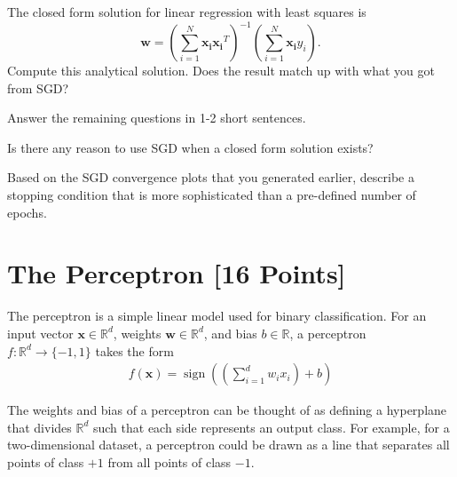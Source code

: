 \begin{problem}[2]
  The closed form solution for linear regression with least squares is \[\mathbf{w} = \left(\sum_{i=1}^N \mathbf{x_i}\mathbf{x_i}^T\right)^{-1}\left(\sum_{i=1}^N \mathbf{x_i}y_i\right).\]  Compute this analytical solution.  Does the result match up with what you got from SGD?
\end{problem}
\begin{solution}
 
\end{solution}

Answer the remaining questions in 1-2 short sentences.

\begin{problem}[2]
  Is there any reason to use SGD when a closed form solution exists?
\end{problem}
\begin{solution}
  
\end{solution}

\begin{problem}[2]
  Based on the SGD convergence plots that you generated earlier, describe a stopping condition that is more sophisticated than a pre-defined number of epochs.
\end{problem}
\begin{solution}
  
\end{solution}



\newpage
\section{The Perceptron [16 Points]}

The perceptron is a simple linear model used for binary classification. For an input vector $\mathbf{x} \in \mathbb{R}^d$, weights $\mathbf{w} \in \mathbb{R}^d$, and bias $b \in \mathbb{R}$, a perceptron $f: \mathbb{R}^d \rightarrow \{-1,1\}$ takes the form
\begin{align*}
  f(\mathbf{x}) = \operatorname{sign}\left(\left(\sum_{i=1}^d w_i x_i\right) + b \right)
\end{align*}

The weights and bias of a perceptron can be thought of as defining a hyperplane that divides $\mathbb{R}^d$ such that each side represents an output class. For example, for a two-dimensional dataset, a perceptron could be drawn as a line that separates all points of class $+1$ from all points of class $-1$.

